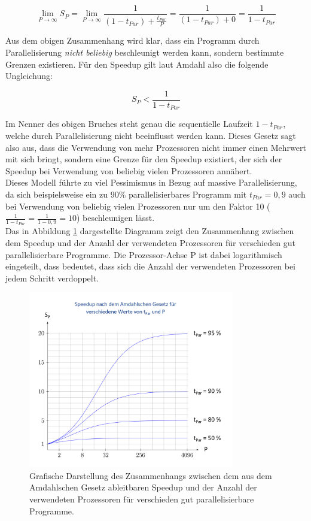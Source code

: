 \begin{description}
					\[ \lim\limits_{P \to \infty} S_P = \lim\limits_{P \to \infty} \frac{1}{(1 - t_{Par}) + \frac{t_{Par}}{P}} = \frac{1}{(1 - t_{Par}) + 0} = \frac{1}{1 - t_{Par}} \]
				
					Aus dem obigen Zusammenhang wird klar, dass ein Programm durch Parallelisierung \textit{nicht beliebig} beschleunigt werden kann, sondern bestimmte Grenzen existieren. Für den Speedup gilt laut Amdahl also die folgende Ungleichung:
					
					\[ S_P < \frac{1}{1 - t_{Par}} \]
					
					Im Nenner des obigen Bruches steht genau die sequentielle Laufzeit $1 - t_{Par}$, welche durch Parallelisierung nicht beeinflusst werden kann. Dieses Gesetz sagt also aus, dass die Verwendung von mehr Prozessoren nicht immer einen Mehrwert mit sich bringt, sondern eine Grenze für den Speedup existiert, der sich der Speedup bei Verwendung von beliebig vielen Prozessoren annähert.\\
					Dieses Modell führte zu viel Pessimismus in Bezug auf massive Parallelisierung, da sich beispielsweise ein zu 90\% parallelisierbares Programm mit $t_{Par} = 0,9$ auch bei Verwendung von beliebig vielen Prozessoren nur um den Faktor 10 ($\frac{1}{1 - t_{Par}} = \frac{1}{1 - 0,9} = 10$) beschleunigen lässt.\\
					Das in Abbildung \ref{fig:Amdahlsches_Gesetz} dargestellte Diagramm zeigt den Zusammenhang zwischen dem Speedup und der Anzahl der verwendeten Prozessoren für verschieden gut parallelisierbare Programme. Die Prozessor-Achse P ist dabei logarithmisch eingeteilt, dass bedeutet, dass sich die Anzahl der verwendeten Prozessoren bei jedem Schritt verdoppelt.
					
					\begin{figure}
						\centering	
						\includegraphics[width=9cm]{Abbildungen/Amdahlsches_Gesetz.png}
						\caption{Grafische Darstellung des Zusammenhangs zwischen dem aus dem Amdahlschen Gesetz ableitbaren Speedup und der Anzahl der verwendeten Prozessoren für verschieden gut parallelisierbare Programme. \cite{GesetzeParallelierung}}
						\label{fig:Amdahlsches_Gesetz}
					\end{figure}
					

\end{description}
